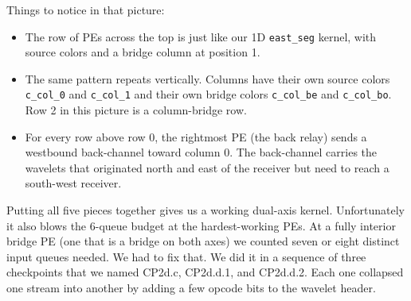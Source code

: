 \documentclass[11pt]{article}
\newcommand{\code}[1]{\texttt{#1}}
\begin{document}
\begin{center}
\end{center}

Things to notice in that picture:

\begin{itemize}[leftmargin=1.3em,itemsep=0.1em]
  \item The row of PEs across the top is just like our 1D
    \code{east\_seg} kernel, with source colors and a bridge
    column at position 1.
  \item The same pattern repeats vertically. Columns have their
    own source colors \code{c\_col\_0} and \code{c\_col\_1} and
    their own bridge colors \code{c\_col\_be} and
    \code{c\_col\_bo}. Row 2 in this picture is a column-bridge
    row.
  \item For every row above row 0, the rightmost PE (the back
    relay) sends a westbound back-channel toward column 0. The
    back-channel carries the wavelets that originated north and
    east of the receiver but need to reach a south-west
    receiver.
\end{itemize}

Putting all five pieces together gives us a working dual-axis
kernel. Unfortunately it also blows the 6-queue budget at the
hardest-working PEs. At a fully interior bridge PE (one that is
a bridge on both axes) we counted seven or eight distinct input
queues needed. We had to fix that. We did it in a sequence of
three checkpoints that we named CP2d.c, CP2d.d.1, and
CP2d.d.2. Each one collapsed one stream into another by adding
a few opcode bits to the wavelet header.
\end{document}
